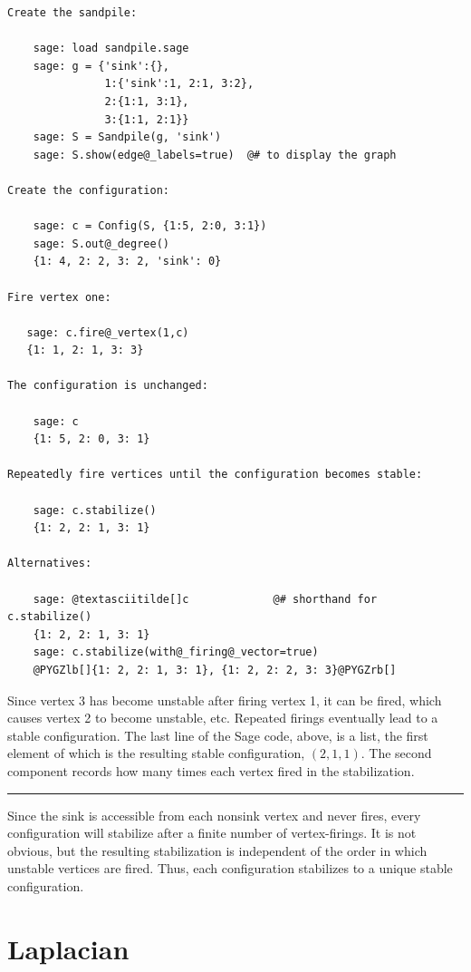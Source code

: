 \documentclass[letterpaper,10pt,english]{manual}
\begin{document}
\begin{Verbatim}[commandchars=@\[\]]
Create the sandpile:

    sage: load sandpile.sage
    sage: g = {'sink':{},
               1:{'sink':1, 2:1, 3:2},
               2:{1:1, 3:1},
               3:{1:1, 2:1}}
    sage: S = Sandpile(g, 'sink')
    sage: S.show(edge@_labels=true)  @# to display the graph

Create the configuration:

    sage: c = Config(S, {1:5, 2:0, 3:1})
    sage: S.out@_degree()
    {1: 4, 2: 2, 3: 2, 'sink': 0}

Fire vertex one:

   sage: c.fire@_vertex(1,c)
   {1: 1, 2: 1, 3: 3}

The configuration is unchanged:

    sage: c
    {1: 5, 2: 0, 3: 1}

Repeatedly fire vertices until the configuration becomes stable:

    sage: c.stabilize()
    {1: 2, 2: 1, 3: 1}

Alternatives:

    sage: @textasciitilde[]c             @# shorthand for c.stabilize()
    {1: 2, 2: 1, 3: 1}
    sage: c.stabilize(with@_firing@_vector=true)
    @PYGZlb[]{1: 2, 2: 1, 3: 1}, {1: 2, 2: 2, 3: 3}@PYGZrb[]
\end{Verbatim}

Since vertex 3 has become unstable after firing vertex 1, it can be fired,
which causes vertex 2 to become unstable, etc.  Repeated firings eventually
lead to a stable configuration.  The last line of the Sage code, above, is a
list, the first element of which is the resulting stable configuration,
$(2,1,1)$.  The second component records how many times each vertex fired in
the stabilization.


\bigskip\hrule{}\bigskip


Since the sink is accessible from each nonsink vertex and never fires, every
configuration will stabilize after a finite number of vertex-firings.  It is
not obvious, but the resulting stabilization is independent of the order in
which unstable vertices are fired.  Thus, each configuration stabilizes to a
unique stable configuration.


\section{Laplacian}
\end{document}
